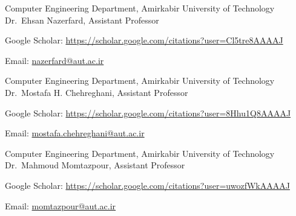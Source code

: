 \begin{cventries}
  \cventry
    {Computer Engineering Department, Amirkabir University of Technology} %
    {Dr.~Ehsan Nazerfard, Assistant Professor} %
    {} %
    {} %
    {
      \begin{cvitems} %
        \item {Google Scholar: \href{https://scholar.google.com/citations?user=Cl5tre8AAAAJ&hl=en}{https://scholar.google.com/citations?user=Cl5tre8AAAAJ}}
        \item {Email: \href{mailto:nazerfard@aut.ac.ir}{nazerfard@aut.ac.ir}}
      \end{cvitems}
    }

  \cventry
    {Computer Engineering Department, Amirkabir University of Technology} %
    {Dr.~Mostafa H. Chehreghani, Assistant Professor} %
    {} %
    {} %
    {
      \begin{cvitems} %
        \item {Google Scholar: \href{https://scholar.google.com/citations?user=8Hhu1Q8AAAAJ&hl=en}{https://scholar.google.com/citations?user=8Hhu1Q8AAAAJ}}
        \item {Email: \href{mailto:mostafa.chehreghani@aut.ac.ir}{mostafa.chehreghani@aut.ac.ir}}
      \end{cvitems}
    }

  \cventry
    {Computer Engineering Department, Amirkabir University of Technology} %
    {Dr.~Mahmoud Momtazpour, Assistant Professor} %
    {} %
    {} %
    {
      \begin{cvitems} %
        \item {Google Scholar: \href{https://scholar.google.com/citations?user=uwozfWkAAAAJ&hl=en}{https://scholar.google.com/citations?user=uwozfWkAAAAJ}}
        \item {Email: \href{mailto:momtazpour@aut.ac.ir}{momtazpour@aut.ac.ir}}
      \end{cvitems}
    }


\end{cventries}
